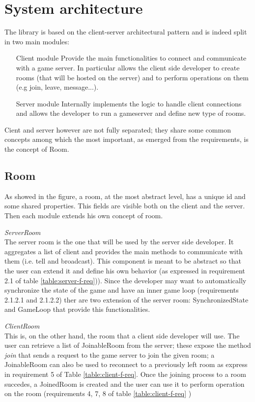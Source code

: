 \chapter{System architecture}
The library is based on the client-server architectural pattern and is indeed split in two main modules: 
\begin{itemize}
	\item[Client module] Provide the main functionalities to connect and communicate with a game server. In particular allows the client side developer to create rooms (that will be hosted on the server) and to perform operations on them (e.g join, leave, message...).
	\item[Server module] Internally implements the logic to handle client connections and allows the developer to run a gameserver and define new type of rooms.
\end{itemize}

Cient and server however are not fully separated; they share some common concepts among which the most important, as emerged from the requirements, is the concept of Room.

\section{Room}
As showed in the figure, a room, at the most abstract level, has a unique id and some shared properties. This fields are visible both on the client and the server. Then each module extends his own concept of room. 

\bigskip
\textit{ServerRoom}
\\
The server room is the one that will be used by the server side developer. It aggregates a list of client and provides the main methods to communicate with them (i.e. tell and broadcast).  This component is meant to be abstract so that the user can extend it and define his own behavior (as expressed in requirement 2.1 of table \ref{table:server-f-req})). Since the developer may want to automatically synchronize the state of the game and have an inner game loop (requirements 2.1.2.1 and 2.1.2.2) ther are two extension of the server room: SynchronizedState and GameLoop that provide this functionalities.

\bigskip
\textit{ClientRoom}
\\
This is, on the other hand, the room that a client side developer will use. The user can retrieve a list of JoinableRoom from the server; these expose the method \textit{join} that sends a request to the game server to join the given room; a JoinableRoom can also be used to reconnect to a previously left room as express in requirement 5 of Table \ref{table:client-f-req}. Once the joining process to a room succedes, a JoinedRoom is created and the user can use it to perform operation on the room (requirements 4, 7, 8 of table \ref{table:client-f-req} ) 

